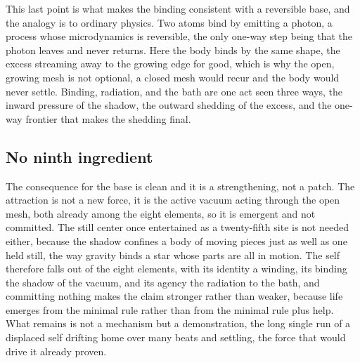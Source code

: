 This last point is what makes the binding consistent with a reversible base, and the analogy is to ordinary physics. Two atoms bind by emitting a photon, a process whose microdynamics is reversible, the only one-way step being that the photon leaves and never returns. Here the body binds by the same shape, the excess streaming away to the growing edge for good, which is why the open, growing mesh is not optional, a closed mesh would recur and the body would never settle. Binding, radiation, and the bath are one act seen three ways, the inward pressure of the shadow, the outward shedding of the excess, and the one-way frontier that makes the shedding final.

\subsection{No ninth ingredient}

The consequence for the base is clean and it is a strengthening, not a patch. The attraction is not a new force, it is the active vacuum acting through the open mesh, both already among the eight elements, so it is emergent and not committed. The still center once entertained as a twenty-fifth site is not needed either, because the shadow confines a body of moving pieces just as well as one held still, the way gravity binds a star whose parts are all in motion. The self therefore falls out of the eight elements, with its identity a winding, its binding the shadow of the vacuum, and its agency the radiation to the bath, and committing nothing makes the claim stronger rather than weaker, because life emerges from the minimal rule rather than from the minimal rule plus help. What remains is not a mechanism but a demonstration, the long single run of a displaced self drifting home over many beats and settling, the force that would drive it already proven.
